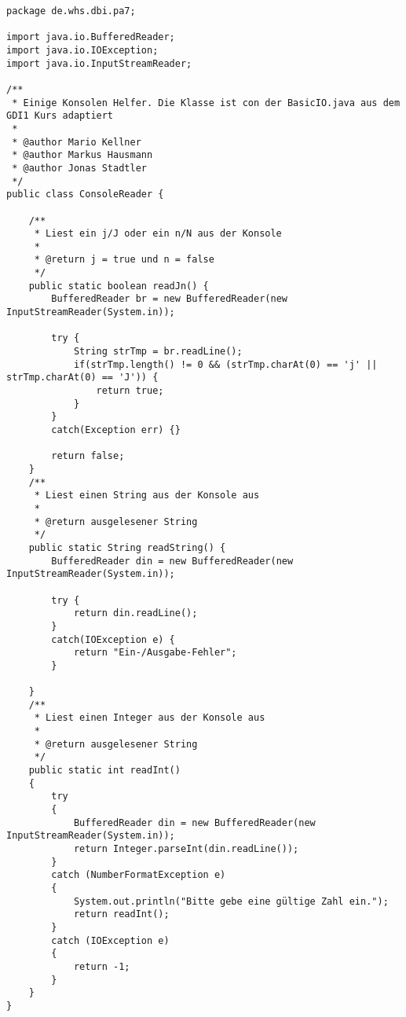 \begin{lstlisting}[caption={ConsoleReader}, label={lst:crv1}]
package de.whs.dbi.pa7;

import java.io.BufferedReader;
import java.io.IOException;
import java.io.InputStreamReader;

/**
 * Einige Konsolen Helfer. Die Klasse ist con der BasicIO.java aus dem GDI1 Kurs adaptiert
 * 
 * @author Mario Kellner
 * @author Markus Hausmann
 * @author Jonas Stadtler
 */
public class ConsoleReader {
	
	/**
	 * Liest ein j/J oder ein n/N aus der Konsole
	 * 
	 * @return j = true und n = false
	 */
	public static boolean readJn() {
		BufferedReader br = new BufferedReader(new InputStreamReader(System.in));
		
		try {
			String strTmp = br.readLine();
			if(strTmp.length() != 0 && (strTmp.charAt(0) == 'j' || strTmp.charAt(0) == 'J')) {
				return true;
			}
		}
		catch(Exception err) {}
		
		return false;
	}
	/**
	 * Liest einen String aus der Konsole aus
	 * 
	 * @return ausgelesener String
	 */
	public static String readString() {
		BufferedReader din = new BufferedReader(new InputStreamReader(System.in)); 
		
		try {	
			return din.readLine();
		}
		catch(IOException e) {				  
			return "Ein-/Ausgabe-Fehler";
		}

	}
	/**
	 * Liest einen Integer aus der Konsole aus
	 * 
	 * @return ausgelesener String
	 */
	public static int readInt()
	{
		try 
		{
			BufferedReader din = new BufferedReader(new InputStreamReader(System.in));
			return Integer.parseInt(din.readLine());
		}
		catch (NumberFormatException e)
		{
			System.out.println("Bitte gebe eine gültige Zahl ein.");
			return readInt();
		}
		catch (IOException e)
		{
			return -1;
		}
	}
}
\end{lstlisting}
